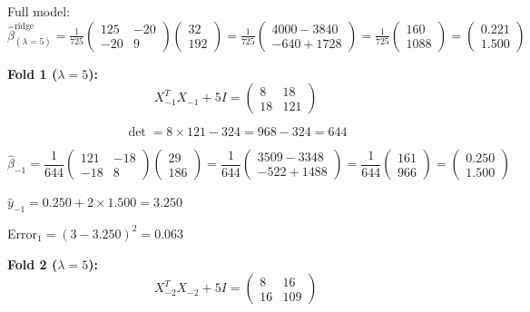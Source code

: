 \documentclass[12pt]{article}
\begin{document}
\begin{solution}
Full model: $\hat{\beta}^{\text{ridge}}_{(\lambda=5)} = \frac{1}{725}\begin{pmatrix} 125 & -20 \\ -20 & 9 \end{pmatrix}\begin{pmatrix} 32 \\ 192 \end{pmatrix} = \frac{1}{725}\begin{pmatrix} 4000 - 3840 \\ -640 + 1728 \end{pmatrix} = \frac{1}{725}\begin{pmatrix} 160 \\ 1088 \end{pmatrix} = \begin{pmatrix} 0.221 \\ 1.500 \end{pmatrix}$

\textbf{Fold 1 ($\lambda = 5$):}
\[X_{-1}^TX_{-1} + 5I = \begin{pmatrix} 8 & 18 \\ 18 & 121 \end{pmatrix}\]

\[\det = 8 \times 121 - 324 = 968 - 324 = 644\]

\[\hat{\beta}_{-1} = \frac{1}{644}\begin{pmatrix} 121 & -18 \\ -18 & 8 \end{pmatrix}\begin{pmatrix} 29 \\ 186 \end{pmatrix} = \frac{1}{644}\begin{pmatrix} 3509 - 3348 \\ -522 + 1488 \end{pmatrix} = \frac{1}{644}\begin{pmatrix} 161 \\ 966 \end{pmatrix} = \begin{pmatrix} 0.250 \\ 1.500 \end{pmatrix}\]

$\hat{y}_{-1} = 0.250 + 2 \times 1.500 = 3.250$

Error$_1 = (3 - 3.250)^2 = 0.063$

\textbf{Fold 2 ($\lambda = 5$):}
\[X_{-2}^TX_{-2} + 5I = \begin{pmatrix} 8 & 16 \\ 16 & 109 \end{pmatrix}\]


\end{solution}
\end{document}

